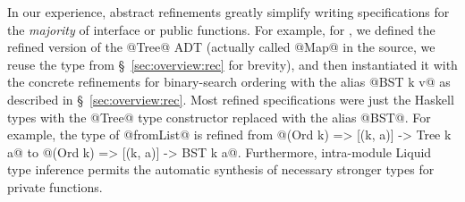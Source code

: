In our experience, abstract refinements greatly simplify writing
specifications for the \emph{majority} of interface or public functions.
For example, for \benchMap, we defined the refined version of the
@Tree@  ADT (actually called @Map@ in the source, we reuse the type from
\S~\ref{sec:overview:rec} for brevity), and then instantiated
it with the concrete refinements for binary-search ordering with the alias
@BST k v@  as described in \S~\ref{sec:overview:rec}.
Most refined specifications were just the Haskell types
with the @Tree@ type constructor replaced with the 
alias @BST@. For example, the type of 
@fromList@ is refined from @(Ord k) => [(k, a)] -> Tree k a@ to 
@(Ord k) => [(k, a)] -> BST k a@.
Furthermore, intra-module Liquid type inference permits 
the automatic synthesis of necessary stronger types for
private functions.

